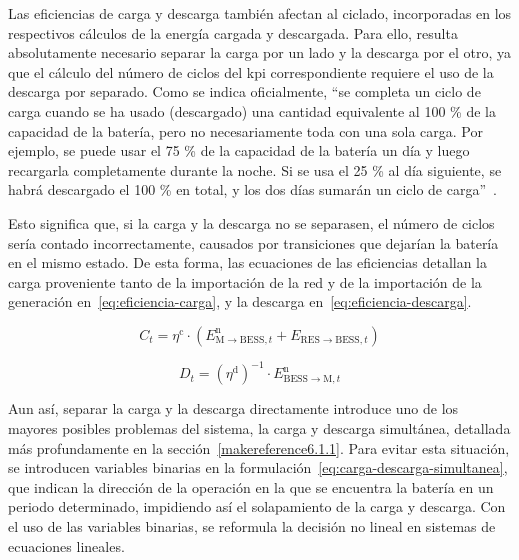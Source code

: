Las eficiencias de carga y descarga también afectan al ciclado, incorporadas en los respectivos cálculos de la energía cargada y descargada. Para ello, resulta absolutamente necesario separar la carga por un lado y la descarga por el otro, ya que el cálculo del número de ciclos del \gls{kpi} correspondiente requiere el uso de la descarga por separado. Como se indica oficialmente, ``se completa un ciclo de carga cuando se ha usado (descargado) una cantidad equivalente al 100 \% de la capacidad de la batería, pero no necesariamente toda con una sola carga. Por ejemplo, se puede usar el 75 \% de la capacidad de la batería un día y luego recargarla completamente durante la noche. Si se usa el 25 \% al día siguiente, se habrá descargado el 100 \% en total, y los dos días sumarán un ciclo de carga''~\cite{apple2025batteries}.

Esto significa que, si la carga y la descarga no se separasen, el número de ciclos sería contado incorrectamente, causados por transiciones que dejarían la batería en el mismo estado. De esta forma, las ecuaciones de las eficiencias detallan la carga proveniente tanto de la importación de la red y de la importación de la generación en~\ref{eq:eficiencia-carga}, y la descarga en~\ref{eq:eficiencia-descarga}.

\begin{equation}%
  \label{eq:eficiencia-carga}
  C_{t} = \eta^{\mathrm{c}} \cdot \left(E^{\mathrm{n}}_{\mathrm{M} \rightarrow \mathrm{BESS}, t} + E_{\mathrm{RES} \rightarrow \mathrm{BESS}, t}\right)
\end{equation}

\begin{equation}%
  \label{eq:eficiencia-descarga}
  D_{t} = {\left(\eta^{\mathrm{d}}\right)}^{-1} \cdot E^{\mathrm{n}}_{\mathrm{BESS} \rightarrow \mathrm{M}, t}
\end{equation}

Aun así, separar la carga y la descarga directamente introduce uno de los mayores posibles problemas del sistema, la carga y descarga simultánea, detallada más profundamente en la sección~\ref{makereference6.1.1}. Para evitar esta situación, se introducen variables binarias en la formulación~\ref{eq:carga-descarga-simultanea}, que indican la dirección de la operación en la que se encuentra la batería en un periodo determinado, impidiendo así el solapamiento de la carga y descarga. Con el uso de las variables binarias, se reformula la decisión no lineal en sistemas de ecuaciones lineales.

